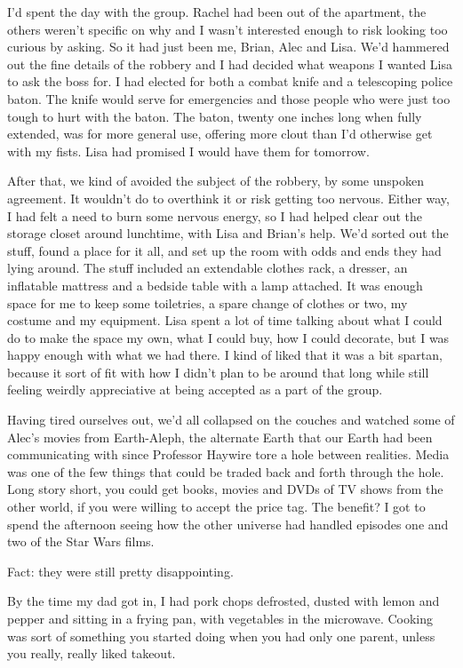 I'd spent the day with the group. Rachel had been out of the apartment, the others weren't specific on why and I wasn't interested enough to risk looking too curious by asking. So it had just been me, Brian, Alec and Lisa. We'd hammered out the fine details of the robbery and I had decided what weapons I wanted Lisa to ask the boss for. I had elected for both a combat knife and a telescoping police baton. The knife would serve for emergencies and those people who were just too tough to hurt with the baton. The baton, twenty one inches long when fully extended, was for more general use, offering more clout than I'd otherwise get with my fists. Lisa had promised I would have them for tomorrow.

After that, we kind of avoided the subject of the robbery, by some unspoken agreement. It wouldn't do to overthink it or risk getting too nervous. Either way, I had felt a need to burn some nervous energy, so I had helped clear out the storage closet around lunchtime, with Lisa and Brian's help. We'd sorted out the stuff, found a place for it all, and set up the room with odds and ends they had lying around. The stuff included an extendable clothes rack, a dresser, an inflatable mattress and a bedside table with a lamp attached. It was enough space for me to keep some toiletries, a spare change of clothes or two, my costume and my equipment. Lisa spent a lot of time talking about what I could do to make the space my own, what I could buy, how I could decorate, but I was happy enough with what we had there. I kind of liked that it was a bit spartan, because it sort of fit with how I didn't plan to be around that long while still feeling weirdly appreciative at being accepted as a part of the group.

Having tired ourselves out, we'd all collapsed on the couches and watched some of Alec's movies from Earth-Aleph, the alternate Earth that our Earth had been communicating with since Professor Haywire tore a hole between realities. Media was one of the few things that could be traded back and forth through the hole. Long story short, you could get books, movies and DVDs of TV shows from the other world, if you were willing to accept the price tag. The benefit? I got to spend the afternoon seeing how the other universe had handled episodes one and two of the Star Wars films.

Fact: they were still pretty disappointing.

By the time my dad got in, I had pork chops defrosted, dusted with lemon and pepper and sitting in a frying pan, with vegetables in the microwave. Cooking was sort of something you started doing when you had only one parent, unless you really, really liked takeout.

